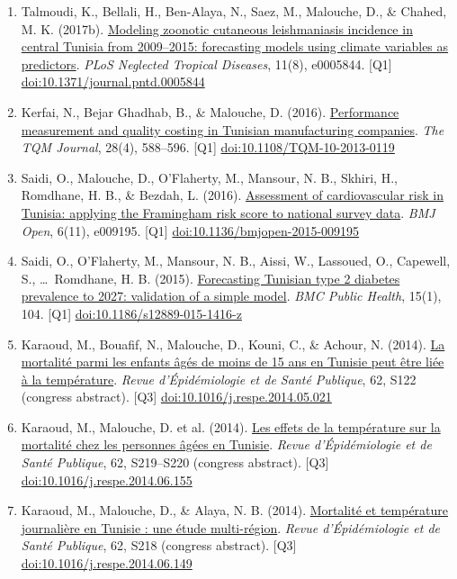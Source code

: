 \documentclass[10pt,a4paper]{article}
\newcommand{\doi}[1]{\href{https://doi.org/#1}{doi:#1}}
\newcommand{\Qu}[1]{[Q#1]}
\begin{document}
\begin{enumerate}
\item Talmoudi, K., Bellali, H., Ben-Alaya, N., Saez, M., Malouche, D., \& Chahed, M. K. (2017b). \href{https://doi.org/10.1371/journal.pntd.0005844}{Modeling zoonotic cutaneous leishmaniasis incidence in central Tunisia from 2009--2015: forecasting models using climate variables as predictors}. \emph{PLoS Neglected Tropical Diseases}, 11(8), e0005844. \Qu1 \doi{10.1371/journal.pntd.0005844}
\item Kerfai, N., Bejar Ghadhab, B., \& Malouche, D. (2016). \href{https://www.emerald.com/insight/content/doi/10.1108/TQM-10-2013-0119/full/html}{Performance measurement and quality costing in Tunisian manufacturing companies}. \emph{The TQM Journal}, 28(4), 588--596. \Qu1 \doi{10.1108/TQM-10-2013-0119}
\item Saidi, O., Malouche, D., O'Flaherty, M., Mansour, N. B., Skhiri, H., Romdhane, H. B., \& Bezdah, L. (2016). \href{https://doi.org/10.1136/bmjopen-2015-009195}{Assessment of cardiovascular risk in Tunisia: applying the Framingham risk score to national survey data}. \emph{BMJ Open}, 6(11), e009195. \Qu1 \doi{10.1136/bmjopen-2015-009195}
\item Saidi, O., O'Flaherty, M., Mansour, N. B., Aissi, W., Lassoued, O., Capewell, S., \ldots\ Romdhane, H. B. (2015). \href{https://bmcpublichealth.biomedcentral.com/articles/10.1186/s12889-015-1416-z}{Forecasting Tunisian type 2 diabetes prevalence to 2027: validation of a simple model}. \emph{BMC Public Health}, 15(1), 104. \Qu1 \doi{10.1186/s12889-015-1416-z}
\item Karaoud, M., Bouafif, N., Malouche, D., Kouni, C., \& Achour, N. (2014). \href{https://www.em-consulte.com/article/911510/article/la-mortalite-parmi-les-enfants-ages-de-moins-de15}{La mortalit\'e parmi les enfants \^ag\'es de moins de 15 ans en Tunisie peut \^etre li\'ee \`a la temp\'erature}. \emph{Revue d'\'Epid\'emiologie et de Sant\'e Publique}, 62, S122 (congress abstract). \Qu3 \doi{10.1016/j.respe.2014.05.021}
\item Karaoud, M., Malouche, D. et al. (2014). \href{https://www.em-consulte.com/article/915656/les-effets-de-la-temperature-sur-la-mortalite-chez}{Les effets de la temp\'erature sur la mortalit\'e chez les personnes \^ag\'ees en Tunisie}. \emph{Revue d'\'Epid\'emiologie et de Sant\'e Publique}, 62, S219--S220 (congress abstract). \Qu3 \doi{10.1016/j.respe.2014.06.155}
\item Karaoud, M., Malouche, D., \& Alaya, N. B. (2014). \href{https://www.em-consulte.com/article/915651/article/mortalite-et-temperature-journaliere-en-tunisie\%C2\%A0-u}{Mortalit\'e et temp\'erature journali\`ere en Tunisie : une \'etude multi-r\'egion}. \emph{Revue d'\'Epid\'emiologie et de Sant\'e Publique}, 62, S218 (congress abstract). \Qu3 \doi{10.1016/j.respe.2014.06.149}

\end{enumerate}
\end{document}
